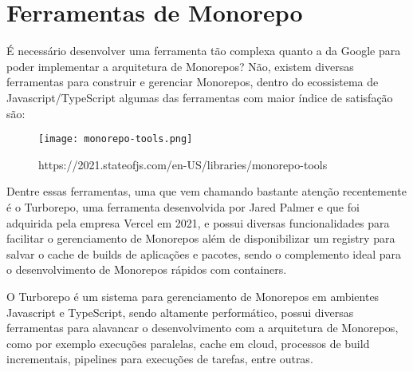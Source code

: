 \section{Ferramentas de Monorepo}

É necessário desenvolver uma ferramenta tão complexa quanto a da Google para poder implementar a arquitetura de Monorepos? Não, existem diversas ferramentas para construir e gerenciar Monorepos, dentro do ecossistema de Javascript/TypeScript algumas das ferramentas com maior índice de satisfação são: 

\begin{figure}[t]
  \texttt{[image: monorepo-tools.png]}
  \centering
  \caption{https://2021.stateofjs.com/en-US/libraries/monorepo-tools}
\end{figure}

Dentre essas ferramentas, uma que vem chamando bastante atenção recentemente é o Turborepo, uma ferramenta desenvolvida por Jared Palmer e que foi adquirida pela empresa Vercel em 2021, e possui diversas funcionalidades para facilitar o gerenciamento de Monorepos além de disponibilizar um registry para salvar o cache de builds de aplicações e pacotes, sendo o complemento ideal para o desenvolvimento de Monorepos rápidos com containers.

O Turborepo é um sistema para gerenciamento de Monorepos em ambientes Javascript e TypeScript, sendo altamente performático, possui diversas ferramentas para alavancar o desenvolvimento com a arquitetura de Monorepos, como por exemplo execuções paralelas, cache em cloud, processos de build incrementais, pipelines para execuções de tarefas, entre outras.
